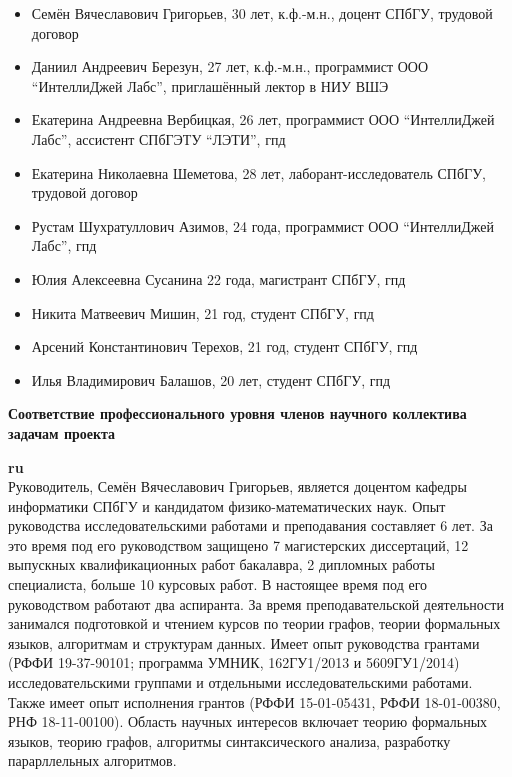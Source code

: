 \documentclass[12pt]{article}  %
\theoremstyle{remark}
\begin{document}
\begin{itemize}
  \item Семён Вячеславович Григорьев, 30 лет, к.ф.-м.н., доцент СПбГУ, трудовой договор
  \item Даниил Андреевич Березун, 27 лет, к.ф.-м.н.,
    программист ООО ``ИнтеллиДжей Лабс'',
    приглашённый лектор в НИУ ВШЭ
  \item Екатерина Андреевна Вербицкая, 26 лет, программист ООО ``ИнтеллиДжей Лабс'', ассистент СПбГЭТУ ``ЛЭТИ'', гпд
  \item Екатерина Николаевна Шеметова, 28 лет, лаборант-исследователь СПбГУ, трудовой договор
  \item Рустам Шухратуллович Азимов, 24 года, программист ООО ``ИнтеллиДжей Лабс'', гпд
  \item Юлия Алексеевна Сусанина 22 года, магистрант СПбГУ, гпд
  \item Никита Матвеевич Мишин, 21 год, студент СПбГУ, гпд
  \item Арсений Константинович Терехов, 21 год, студент СПбГУ, гпд
  \item Илья Владимирович Балашов, 20 лет, студент СПбГУ, гпд
\end{itemize}



\textbf{Соответствие профессионального уровня членов научного коллектива задачам проекта}

\textbf{ru}\\
%
Руководитель, Семён Вячеславович Григорьев, является доцентом кафедры информатики СПбГУ и кандидатом физико-математических наук.
Опыт руководства исследовательскими работами и преподавания составляет 6 лет.
За это время под его руководством защищено 7 магистерских диссертаций, 12 выпускных квалификационных работ бакалавра, 2 дипломных работы специалиста, больше 10 курсовых работ.
В настоящее время под его руководством работают два аспиранта.
За время преподавательской деятельности занимался подготовкой и чтением курсов по теории графов, теории формальных языков, алгоритмам и структурам данных.
Имеет опыт руководства грантами (РФФИ 19-37-90101; программа УМНИК, 162ГУ1/2013 и 5609ГУ1/2014) исследовательскими группами и отдельными исследовательскими работами.
Также имеет опыт исполнения грантов (РФФИ 15-01-05431, РФФИ 18-01-00380, РНФ 18-11-00100).
Область научных интересов включает теорию формальных языков, теорию графов, алгоритмы синтаксического анализа, разработку парарллельных алгоритмов.
\end{document}
